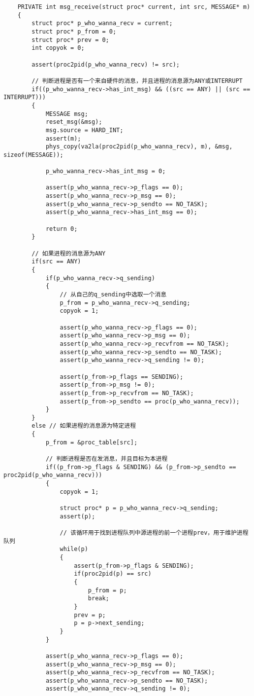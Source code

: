 \documentclass[a4paper,left=2.5cm,right=2.5cm,11pt]{article}
\begin{document}
	\begin{lstlisting}
	PRIVATE int msg_receive(struct proc* current, int src, MESSAGE* m)
	{
		struct proc* p_who_wanna_recv = current;
		struct proc* p_from = 0;
		struct proc* prev = 0;
		int copyok = 0;

		assert(proc2pid(p_who_wanna_recv) != src);

		// 判断进程是否有一个来自硬件的消息，并且进程的消息源为ANY或INTERRUPT
		if((p_who_wanna_recv->has_int_msg) && ((src == ANY) || (src == INTERRUPT)))
		{
			MESSAGE msg;
			reset_msg(&msg);
			msg.source = HARD_INT;
			assert(m);
			phys_copy(va2la(proc2pid(p_who_wanna_recv), m), &msg, sizeof(MESSAGE));
			
			p_who_wanna_recv->has_int_msg = 0;

			assert(p_who_wanna_recv->p_flags == 0);
			assert(p_who_wanna_recv->p_msg == 0);
			assert(p_who_wanna_recv->p_sendto == NO_TASK);
			assert(p_who_wanna_recv->has_int_msg == 0);

			return 0;
		}

		// 如果进程的消息源为ANY
		if(src == ANY)
		{
			if(p_who_wanna_recv->q_sending)
			{
				// 从自己的q_sending中选取一个消息
				p_from = p_who_wanna_recv->q_sending;
				copyok = 1;

				assert(p_who_wanna_recv->p_flags == 0);
				assert(p_who_wanna_recv->p_msg == 0);
				assert(p_who_wanna_recv->p_recvfrom == NO_TASK);
				assert(p_who_wanna_recv->p_sendto == NO_TASK);
				assert(p_who_wanna_recv->q_sending != 0);
				
				assert(p_from->p_flags == SENDING);
				assert(p_from->p_msg != 0);
				assert(p_from->p_recvfrom == NO_TASK);
				assert(p_from->p_sendto == proc(p_who_wanna_recv));
			}
		}
		else // 如果进程的消息源为特定进程
		{
			p_from = &proc_table[src];

			// 判断进程是否在发消息，并且目标为本进程
			if((p_from->p_flags & SENDING) && (p_from->p_sendto == proc2pid(p_who_wanna_recv)))
			{
				copyok = 1;
				
				struct proc* p = p_who_wanna_recv->q_sending;
				assert(p);

				// 该循环用于找到进程队列中源进程的前一个进程prev，用于维护进程队列
				while(p)
				{
					assert(p_from->p_flags & SENDING);
					if(proc2pid(p) == src)
					{
						p_from = p;
						break;
					}
					prev = p;
					p = p->next_sending;
				}
			}

			assert(p_who_wanna_recv->p_flags == 0);
			assert(p_who_wanna_recv->p_msg == 0);
			assert(p_who_wanna_recv->p_recvfrom == NO_TASK);
			assert(p_who_wanna_recv->p_sendto == NO_TASK);
			assert(p_who_wanna_recv->q_sending != 0);


\end{lstlisting}
\end{document}
